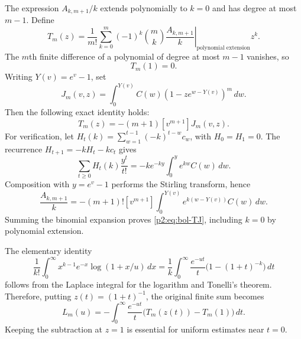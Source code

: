 \documentclass[11pt,a4paper]{article}
\theoremstyle{definition}
\theoremstyle{remark}
\numberwithin{equation}{section}
\begin{document}
The expression $A_{k,m+1}/k$ extends polynomially to $k=0$ and has degree
at most $m-1$.  Define
\[
 T_m(z)=\frac1{m!}\sum_{k=0}^m(-1)^k\binom mk
 \left.\frac{A_{k,m+1}}k\right|_{\text{polynomial extension}}z^k.
\]
The $m$th finite difference of a polynomial of degree at most $m-1$
vanishes, so
\begin{equation}\label{p2:eq:bol-Tone}T_m(1)=0.\end{equation}
Writing $Y(v)=e^v-1$, set
\begin{equation}\label{p2:eq:bol-J}
 J_m(v,z)=\int_0^{Y(v)}C(w)
       \left(1-ze^{w-Y(v)}\right)^m\,dw.
\end{equation}
Then the following exact identity holds:
\begin{equation}\label{p2:eq:bol-TJ}
 T_m(z)=-(m+1)[v^{m+1}]J_m(v,z).
\end{equation}
For verification, let
$H_t(k)=\sum_{w=1}^{t-1}(-k)^{t-w}c_w$, with $H_0=H_1=0$.
The recurrence $H_{t+1}=-kH_t-kc_t$ gives
\[
 \sum_{t\ge0}H_t(k)\frac{y^t}{t!}
 =-k e^{-ky}\int_0^y e^{kw}C(w)\,dw.
\]
Composition with $y=e^v-1$ performs the Stirling transform, hence
\[
 \frac{A_{k,m+1}}k
 =-(m+1)![v^{m+1}]\int_0^{Y(v)}
                  e^{k(w-Y(v))}C(w)\,dw.
\]
Summing the binomial expansion proves \eqref{p2:eq:bol-TJ}, including $k=0$
by polynomial extension.

The elementary identity
\[
 \frac1{k!}\int_0^\infty x^{k-1}e^{-x}\log(1+x/u)\,dx
 =\frac1k\int_0^\infty\frac{e^{-ut}}t
                   \bigl(1-(1+t)^{-k}\bigr)\,dt
\]
follows from the Laplace integral for the logarithm and Tonelli's theorem.
Therefore, putting $z(t)=(1+t)^{-1}$, the original finite sum becomes
\begin{equation}\label{p2:eq:bol-LT}
 L_m(u)=-\int_0^\infty\frac{e^{-ut}}t
                 \bigl(T_m(z(t))-T_m(1)\bigr)\,dt.
\end{equation}
Keeping the subtraction at $z=1$ is essential for uniform estimates near
$t=0$.
\end{document}
